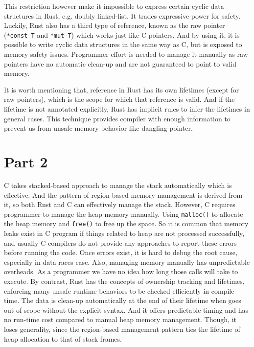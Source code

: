 \documentclass[10pt,a4paper,twocolumn]{article}
\newcommand{\code}[1]{\colorbox{light-gray}{\texttt{#1}}}
\begin{document}
This restriction however make it impossible to express certain cyclic data structures in Rust, e.g. doubly linked-list. It trades expressive power for safety. Luckily, Rust also has a third type of reference, known as the raw pointer (\lstinline{*const T} and \lstinline{*mut T}) which works just like C pointers. And by using it, it is possible to write cyclic data structures in the same way as C, but is exposed to memory safety issues. Programmer effort is needed to manage it manually as raw pointers have no automatic clean-up and are not guaranteed to point to valid memory. 

It is worth mentioning that, reference in Rust has its own lifetimes (except for raw pointers), which is the scope for which that reference is valid. And if the lifetime is not annotated explicitly, Rust has implicit rules to infer the lifetimes in general cases. This technique provides compiler with enough information to prevent us from unsafe memory behavior like dangling pointer.  

\section*{Part 2}

C takes stacked-based approach to manage the stack automatically which is effective. And the pattern of region-based memory management is derived from it, so both Rust and C can effectively manage the stack. However, C requires programmer to manage the heap memory manually. Using \code{malloc()} to allocate the heap memory and \code{free()} to free up the space. So it is common that memory leaks exist in C program if things related to heap are not processed successfully, and usually C compilers do not provide any approaches to report these errors before running the code. Once errors exist, it is hard to debug the root cause, especially in data races case. Also, managing memory manually has unpredictable overheads. As a programmer we have no idea how long those calls will take to execute. By contrast, Rust has the concepts of ownership tracking and lifetimes, enforcing many unsafe runtime behaviors to be checked efficiently in compile time. The data is clean-up automatically at the end of their lifetime when goes out of scope without the explicit syntax. And it offers predictable timing and has no run-time cost compared to manual heap memory management. Though, it loses generality, since the region-based management pattern ties the lifetime of heap allocation to that of stack frames.
\end{document}

